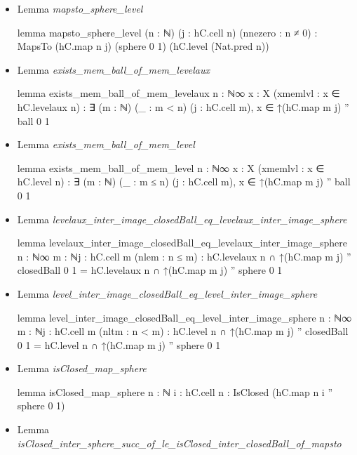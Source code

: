 \documentclass[colorinlistoftodos]{article}
\begin{document}
\begin{itemize}
  \item Lemma \emph{mapsto\_sphere\_level}
\begin{leancode}
lemma mapsto_sphere_level (n : ℕ) (j : hC.cell n) (nnezero : n ≠ 0) : 
  MapsTo (hC.map n j) (sphere 0 1) (hC.level (Nat.pred n))
\end{leancode}
  \item Lemma \emph{exists\_mem\_ball\_of\_mem\_levelaux}
\begin{leancode}
lemma exists_mem_ball_of_mem_levelaux {n : ℕ∞} {x : X} (xmemlvl : x ∈ hC.levelaux n) : 
  ∃ (m : ℕ) (_ : m < n) (j : hC.cell m), x ∈ ↑(hC.map m j) '' ball 0 1
\end{leancode}
  \item Lemma \emph{exists\_mem\_ball\_of\_mem\_level}
\begin{leancode}
lemma exists_mem_ball_of_mem_level {n : ℕ∞} {x : X} (xmemlvl : x ∈ hC.level n) : 
  ∃ (m : ℕ) (_ : m ≤ n) (j : hC.cell m), x ∈ ↑(hC.map m j) '' ball 0 1
\end{leancode}
  \item Lemma \emph{levelaux\_inter\_image\_closedBall\_eq\_levelaux\_inter\_image\_sphere}
\begin{leancode}
lemma levelaux_inter_image_closedBall_eq_levelaux_inter_image_sphere 
{n : ℕ∞} {m : ℕ}{j : hC.cell m} (nlem : n ≤ m) :
  hC.levelaux n ∩ ↑(hC.map m j) '' closedBall 0 1 = 
  hC.levelaux n ∩ ↑(hC.map m j) '' sphere 0 1
\end{leancode}
  \item Lemma \emph{level\_inter\_image\_closedBall\_eq\_level\_inter\_image\_sphere}
\begin{leancode}
lemma level_inter_image_closedBall_eq_level_inter_image_sphere 
{n : ℕ∞} {m : ℕ}{j : hC.cell m} (nltm : n < m) : 
  hC.level n ∩ ↑(hC.map m j) '' closedBall 0 1 = 
  hC.level n ∩ ↑(hC.map m j) '' sphere 0 1
\end{leancode}
  \item Lemma \emph{isClosed\_map\_sphere}
\begin{leancode}
lemma isClosed_map_sphere {n : ℕ} {i : hC.cell n} : IsClosed (hC.map n i '' sphere 0 1)
\end{leancode}
  \item Lemma \emph{isClosed\_inter\_sphere\_succ\_of\_le\_isClosed\_inter\_closedBall\_of\_mapsto}

\end{itemize}
\end{document}
